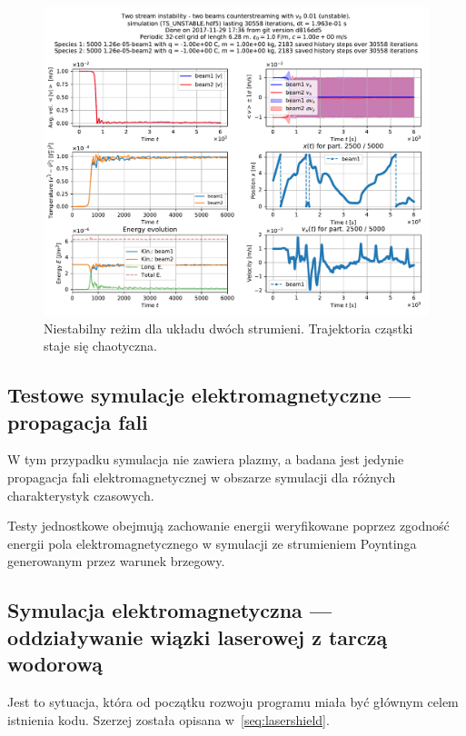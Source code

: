 \begin{figure}[h!]
  \includegraphics[width=\textwidth]{Images/TS_UNSTABLE}
  \caption{Niestabilny reżim dla układu dwóch strumieni. Trajektoria cząstki staje się chaotyczna.\label{fig:twostream-unstable}}
\end{figure}

\subsection{Testowe symulacje elektromagnetyczne --- propagacja fali}
W tym przypadku symulacja nie zawiera plazmy, a badana jest jedynie propagacja fali elektromagnetycznej w obszarze
symulacji dla różnych charakterystyk czasowych. 

Testy jednostkowe obejmują zachowanie energii weryfikowane poprzez zgodność
energii pola elektromagnetycznego w symulacji ze strumieniem Poyntinga generowanym
przez warunek brzegowy. %


\subsection{Symulacja elektromagnetyczna --- oddziaływanie wiązki laserowej z tarczą wodorową}

Jest to sytuacja, która od początku rozwoju programu miała być głównym celem istnienia kodu. Szerzej została opisana w~\ref{seq:lasershield}.

